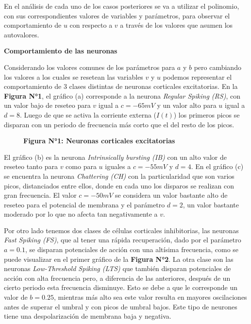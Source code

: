 \documentclass[12pt,a4paper]{article}
\begin{document}
En el análisis de cada uno de los casos posteriores se va a utilizar el polinomio, con sus correspondientes valores de variables y parámetros, para observar el comportamiento de $u$ con respecto a $v$ a través de los valores que asumen los autovalores.
\bigskip

\begin{center}
\begin{large}
\textbf{Comportamiento de las neuronas}
\end{large}
\end{center}

Considerando los valores comunes de los parámetros para $a$ y $b$ pero cambiando los valores a los cuales se resetean las variables $v$ y $u$ podemos representar el comportamiento de 3 clases distintas de neuronas corticales excitatorias. En la \textbf{Figura N°1}, el gráfico (a) corresponde a la neurona \textit{Regular Spiking (RS)}, con un valor bajo de reseteo para $v$ igual a $c=-65mV$ y un valor alto para $u$ igual a $d=8$. Luego de que se activa la corriente externa ($I(t)$) los primeros picos se disparan con un periodo de frecuencia más corto que el del resto de los picos. 


\begin{figure}[h!]
\centering
\caption*{\textbf{Figura N°1: Neuronas corticales excitatorias}}
\end{figure} 

El gráfico (b) es la neurona \textit{Intrinsically bursting (IB)} con un alto valor de reseteo tanto para $v$ como para $u$ iguales a $c=-55mV$ y $d=4$. En el gráfico (c) se encuentra la neurona \textit{Chattering (CH)}  con la particularidad que son varios picos, distanciados entre ellos, donde en cada uno los disparos se realizan con gran frecuencia. El valor $c= -50 mV$ se considera un valor bastante alto de reseteo para el potencial de membrana y el parámetro $d=2$, un valor bastante moderado por lo que no afecta tan negativamente a $v$.

Por otro lado tenemos dos clases de células corticales inhibitorias, las neuronas \textit{Fast Spiking (FS)}, que al tener una rápida recuperación, dado por el parámetro $a=0.1$, se disparan potenciales de acción con una altísima frecuencia, como se puede visualizar en el primer gráfico de la \textbf{Figura N°2}. La otra clase son las neuronas \textit{Low-Threshold Spiking (LTS)} que también disparan potenciales de acción con alta frecuencia pero, a diferencia de las anteriores, después de un cierto periodo esta frecuencia disminuye. Esto se debe a que le corresponde un valor de $b=0.25$, mientras más alto sea este valor resulta en mayores oscilaciones antes de superar el umbral y con picos de umbral bajos. Este tipo de neurones tiene una despolarización de membrana baja y negativa.
\end{document}
